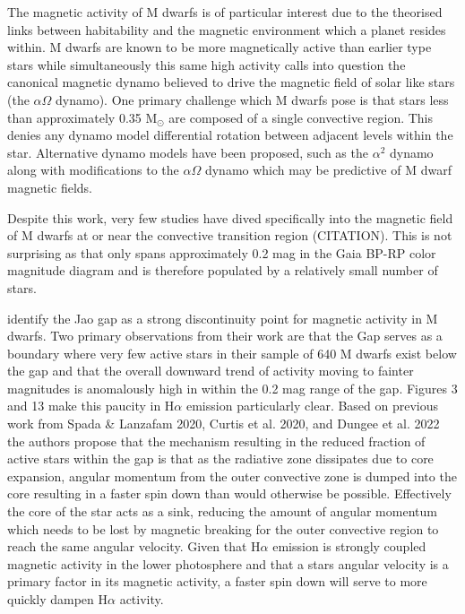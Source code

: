 The magnetic activity of M dwarfs is of particular interest due to the theorised links between habitability and the magnetic environment which a planet resides within. M dwarfs are known to be more magnetically active than earlier type stars while simultaneously this same high activity calls into question the canonical magnetic dynamo believed to drive the magnetic field of solar like stars (the $\alpha\Omega$ dynamo). One primary challenge which M dwarfs pose is that stars less than approximately 0.35 M$_{\odot}$ are composed of a single convective region. This denies any dynamo model differential rotation between adjacent levels within the star. Alternative dynamo models have been proposed, such as the $\alpha^{2}$ dynamo along with modifications to the $\alpha\Omega$ dynamo which may be predictive of M dwarf magnetic fields.

Despite this work, very few studies have dived specifically into the magnetic field of M dwarfs at or near the convective transition region {\color{red}(CITATION)}. This is not surprising as that only spans approximately 0.2 mag in the Gaia BP-RP color magnitude diagram and is therefore populated by a relatively small number of stars. 

\citep{Jao2023} identify the Jao gap as a strong discontinuity point for
magnetic activity in M dwarfs. Two primary observations from their work are
that the Gap serves as a boundary where very few active stars in their sample
of 640 M dwarfs exist below the gap and that the overall downward trend of
activity moving to fainter magnitudes is anomalously high in within the 0.2 mag
range of the gap. \citeauthor{Jao2023} Figures 3 and 13 make this paucity in
H$\alpha$ emission particularly clear. Based on previous work from
{\color{red}Spada \& Lanzafam 2020}, {\color{red}Curtis et al. 2020, and Dungee
et al. 2022} the authors propose that the mechanism resulting in the reduced
fraction of active stars within the gap is that as the radiative zone dissipates
due to core expansion, angular momentum from the outer convective zone is
dumped into the core resulting in a faster spin down than would otherwise be
possible. Effectively the core of the star acts as a sink, reducing the amount
of angular momentum which needs to be lost by magnetic breaking for the outer
convective region to reach the same angular velocity. Given that H$\alpha$
emission is strongly coupled magnetic activity in the lower photosphere and
that a stars angular velocity is a primary factor in its magnetic activity, a
faster spin down will serve to more quickly dampen H$\alpha$ activity.

